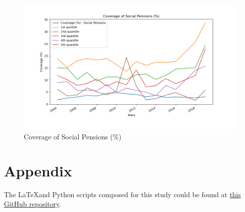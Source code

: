 \documentclass[11pt]{article}
\begin{document}
\begin{figure}[htbp]
    \begin{center}
    \includegraphics[width=6in]{pensioncoverage.png}
    \caption{Coverage of Social Pensions (\%)}
    \label{fig:pnsn}
    \end{center}
\end{figure}

\section*{Appendix}

The \LaTeX\;and Python scripts composed for this study could be found at \href{https://github.com/yildirimalper/tr-socialasst}{this GitHub repository}. 


\pagebreak



\end{document}

